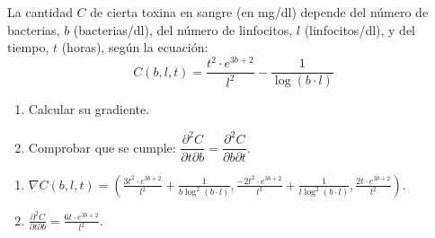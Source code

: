 {La cantidad $C$ de cierta toxina en sangre (en mg/dl) depende del número de bacterias, $b$ (bacterias/dl), del número de linfocitos, $l$ (linfocitos/dl), y del tiempo, $t$ (horas), según la ecuación:
\[
C(b,l,t) = \frac{{t^2  \cdot e^{3b + 2} }}{{l^2 }} - \frac{1}{{\log
(b \cdot l)}}
\]
\begin{enumerate}
\item Calcular su gradiente.

\item Comprobar que se cumple: $\dfrac{{\partial ^2 C}}{{\partial t\partial b}} = \dfrac{{\partial ^2 C}}{{\partial b\partial t}}$.
\end{enumerate}
}
{
\begin{enumerate}
\item $\nabla C(b,l,t)=\left( \frac{{3t^2 \cdot e^{3b + 2} }}{{l^2 }}+\frac{1}{{b\log^2
(b \cdot l)}}, \frac{{-2t^2 \cdot e^{3b + 2} }}{{l^3 }}+\frac{1}{{l\log^2
(b \cdot l)}}, \frac{{2t \cdot e^{3b + 2} }}{{l^2 }} \right)$.

\item $\frac{\partial ^2 C}{\partial t \partial b}  = \frac{{6t \cdot e^{3b + 2} }}{{l^2 }}$.
\end{enumerate}
}
